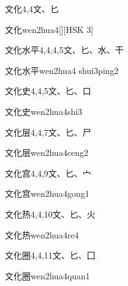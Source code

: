 \begin{Entry}{文化}{4,4}{⽂、⼔}
  \begin{Phonetics}{文化}{wen2hua4}[][HSK 3]
  \end{Phonetics}
\end{Entry}

\begin{Entry}{文化水平}{4,4,4,5}{⽂、⼔、⽔、⼲}
  \begin{Phonetics}{文化水平}{wen2hua4 shui3ping2}
  \end{Phonetics}
\end{Entry}

\begin{Entry}{文化史}{4,4,5}{⽂、⼔、⼝}
  \begin{Phonetics}{文化史}{wen2hua4shi3}
  \end{Phonetics}
\end{Entry}

\begin{Entry}{文化层}{4,4,7}{⽂、⼔、⼫}
  \begin{Phonetics}{文化层}{wen2hua4ceng2}
  \end{Phonetics}
\end{Entry}

\begin{Entry}{文化宫}{4,4,9}{⽂、⼔、⼧}
  \begin{Phonetics}{文化宫}{wen2hua4gong1}
  \end{Phonetics}
\end{Entry}

\begin{Entry}{文化热}{4,4,10}{⽂、⼔、⽕}
  \begin{Phonetics}{文化热}{wen2hua4re4}
  \end{Phonetics}
\end{Entry}

\begin{Entry}{文化圈}{4,4,11}{⽂、⼔、⼞}
  \begin{Phonetics}{文化圈}{wen2hua4quan1}
  \end{Phonetics}
\end{Entry}

